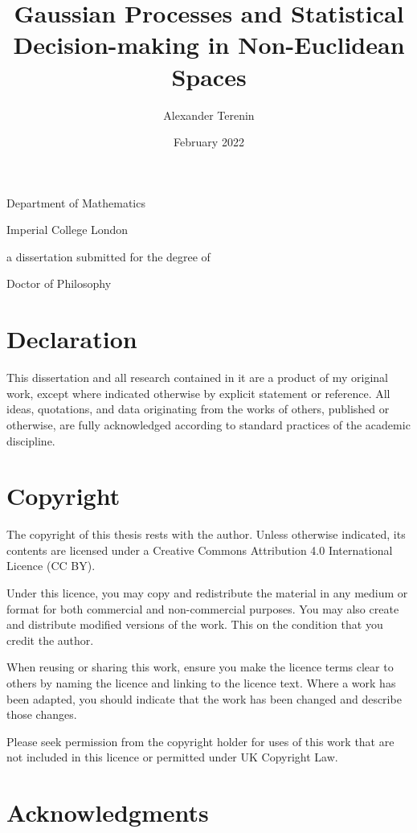 \documentclass[11pt]{book}
\title{Gaussian Processes and Statistical Decision-making in Non-Euclidean Spaces}
\author{Alexander Terenin}
\date{February 2022}
\begin{document}
\begin{titlepage}
\maketitlehooka
\centering
\huge
\null
\vfill
\thetitle
\par
\vfill
\LARGE
\theauthor
\par
\large
Department of Mathematics
\par
Imperial College London
\par
\vfill
\null
\vfill
a dissertation submitted for the degree of
\par
Doctor of Philosophy
\par
\strut
\par
\thedate
\par
\vfill
\null
\maketitlehookd
\end{titlepage}

\chapter*{Declaration}

This dissertation and all research contained in it are a product of my original work, except where indicated otherwise by explicit statement or reference.
All ideas, quotations, and data originating from the works of others, published or otherwise, are fully acknowledged according to standard practices of the academic discipline.

\chapter*{Copyright}

The copyright of this thesis rests with the author. Unless otherwise indicated, its contents are licensed under a Creative Commons Attribution 4.0 International Licence (CC BY).

Under this licence, you may copy and redistribute the material in any medium or format for both commercial and non-commercial purposes. You may also create and distribute modified versions of the work. This on the condition that you credit the author.

When reusing or sharing this work, ensure you make the licence terms clear to others by naming the licence and linking to the licence text. Where a work has been adapted, you should indicate that the work has been changed and describe those changes.

Please seek permission from the copyright holder for uses of this work that are not included in this licence or permitted under UK Copyright Law.

\chapter*{Acknowledgments}
\end{document}
